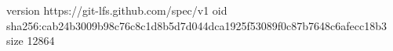 version https://git-lfs.github.com/spec/v1
oid sha256:cab24b3009b98c76c8c1d8b5d7d044dca1925f53089f0c87b7648c6afecc18b3
size 12864
